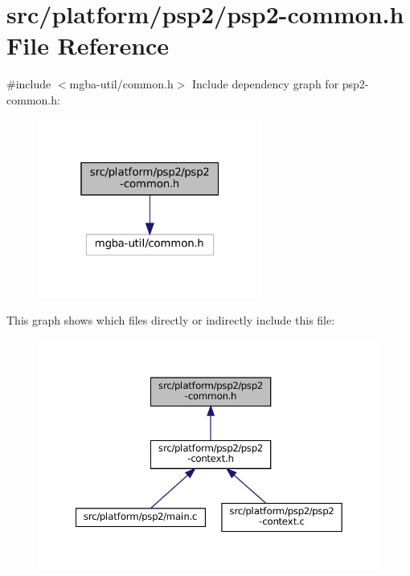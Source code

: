 \hypertarget{psp2-common_8h}{}\section{src/platform/psp2/psp2-\/common.h File Reference}
\label{psp2-common_8h}
{\ttfamily \#include $<$mgba-\/util/common.\+h$>$}\newline
Include dependency graph for psp2-\/common.h\+:
\nopagebreak
\begin{figure}[H]
\begin{center}
\leavevmode
\includegraphics[width=208pt]{psp2-common_8h__incl}
\end{center}
\end{figure}
This graph shows which files directly or indirectly include this file\+:
\nopagebreak
\begin{figure}[H]
\begin{center}
\leavevmode
\includegraphics[width=350pt]{psp2-common_8h__dep__incl}
\end{center}
\end{figure}

